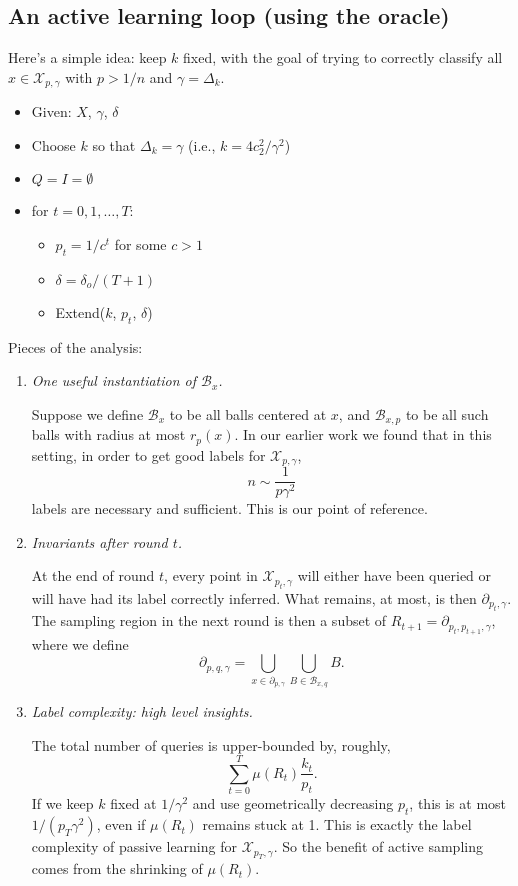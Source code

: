 \documentclass{article}
\def\X{{\mathcal X}}
\def\B{{\mathcal B}}
\begin{document}
\subsection{An active learning loop (using the oracle)}

Here's a simple idea: keep $k$ fixed, with the goal of trying to correctly classify all $x \in \X_{p,\gamma}$ with $p > 1/n$ and $\gamma = \Delta_k$. 

\begin{itemize}
\item Given: $X$, $\gamma$, $\delta$
\item Choose $k$ so that $\Delta_k = \gamma$ (i.e., $k = 4c_2^2/\gamma^2$)
\item $Q = I = \emptyset$
\item for $t = 0, 1, \ldots, T$:
\begin{itemize}
\item $p_t = 1/c^t$ for some $c > 1$
\item $\delta = \delta_o/(T + 1)$
\item Extend($k$, $p_t$, $\delta$)
\end{itemize}
\end{itemize}

Pieces of the analysis:
\begin{enumerate}
\item {\it One useful instantiation of $\B_x$.}

Suppose we define $\B_x$ to be all balls centered at $x$, and $\B_{x,p}$ to be all such balls with radius at most $r_p(x)$. In our earlier work we found that in this setting, in order to get good labels for $\X_{p,\gamma}$, 
$$ n \sim \frac{1}{p \gamma^2}$$
labels are necessary and sufficient. This is our point of reference.

\item {\it Invariants after round $t$.} 

At the end of round $t$, every point in $\X_{p_t,\gamma}$ will either have been queried or will have had its label correctly inferred. What remains, at most, is then $\partial_{p_t,\gamma}$. The sampling region in the next round is then a subset of $R_{t+1} = \partial_{p_t, p_{t+1}, \gamma}$, where we define
$$ \partial_{p,q,\gamma} = \bigcup_{x \in \partial_{p,\gamma}} \bigcup_{B \in \B_{x,q}} B .$$

\item {\it Label complexity: high level insights.}

The total number of queries is upper-bounded by, roughly,
$$ \sum_{t=0}^T \mu(R_t) \frac{k_t}{p_t} .$$
If we keep $k$ fixed at $1/\gamma^2$ and use geometrically decreasing $p_t$, this is at most $1/(p_T \gamma^2)$, even if $\mu(R_t)$ remains stuck at 1. This is exactly the label complexity of passive learning for $\X_{p_T, \gamma}$. So the benefit of active sampling comes from the shrinking of $\mu(R_t)$.

\end{enumerate}
\end{document}
